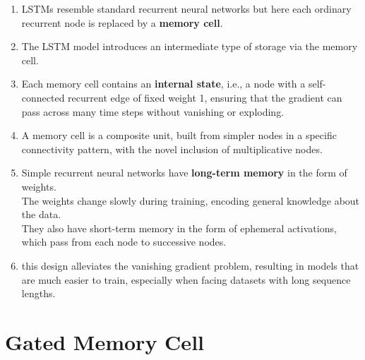 \begin{enumerate}
    \item LSTMs resemble standard recurrent neural networks but here each ordinary recurrent node is replaced by a \textbf{memory cell}.

    \item The LSTM model introduces an intermediate type of storage via the memory cell. 
    
    \item Each memory cell contains an \textbf{internal state}, i.e., a node with a self-connected recurrent edge of fixed weight 1, ensuring that the gradient can pass across many time steps without vanishing or exploding.
    
    \item A memory cell is a composite unit, built from simpler nodes in a specific connectivity pattern, with the novel inclusion of multiplicative nodes.

    \item Simple recurrent neural networks have \textbf{long-term memory} in the form of weights.\\
    The weights change slowly during training, encoding general knowledge about the data. \\
    They also have short-term memory in the form of ephemeral activations, which pass from each node to successive nodes. 

    \item this design alleviates the vanishing gradient problem, resulting in models that are much easier to train, especially when facing datasets with long sequence lengths.
\end{enumerate}




\section{Gated Memory Cell \cite{dnn-1}} \label{lstm: Gated Memory Cell}

